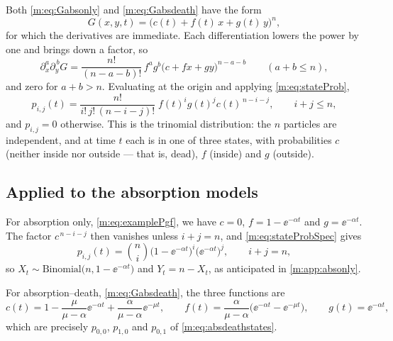 Both \cref{m:eq:Gabsonly} and \cref{m:eq:Gabsdeath} have the form
\begin{equation}
\label{m:eq:multilinear}
G(x,y,t) = \bigl(c(t) + f(t)\,x + g(t)\,y\bigr)^n ,
\end{equation}
for which the derivatives are immediate. Each differentiation lowers the power by
one and brings down a factor, so
\begin{equation}
\label{m:eq:derivs}
\partial_x^{a}\partial_y^{\,b}G
= \frac{n!}{(n-a-b)!}\,f^{a}g^{b}\bigl(c+fx+gy\bigr)^{n-a-b}
\qquad(a+b\le n),
\end{equation}
and zero for $a+b>n$. Evaluating at the origin and applying \cref{m:eq:stateProb},
\begin{equation}
\label{m:eq:stateProbSpec}
p_{i,j}(t) = \frac{n!}{i!\,j!\,(n-i-j)!}\;f(t)^{i}g(t)^{j}c(t)^{\,n-i-j},
\qquad i+j\le n,
\end{equation}
and $p_{i,j}=0$ otherwise. This is the trinomial distribution: the $n$ particles
are independent, and at time $t$ each is in one of three states, with probabilities
$c$ (neither inside nor outside --- that is, dead), $f$ (inside) and $g$ (outside).

\subsection*{Applied to the absorption models}

For absorption only, \cref{m:eq:examplePgf}, we have $c=0$, $f = 1-\ee^{-\alpha t}$
and $g = \ee^{-\alpha t}$. The factor $c^{\,n-i-j}$ then vanishes unless $i+j=n$,
and \cref{m:eq:stateProbSpec} gives
\begin{equation*}
p_{i,j}(t) = \binom{n}{i}\bigl(1-\ee^{-\alpha t}\bigr)^{i}\bigl(\ee^{-\alpha t}\bigr)^{j},
\qquad i+j=n,
\end{equation*}
so $X_t\sim\text{Binomial}\bigl(n,1-\ee^{-\alpha t}\bigr)$ and $Y_t = n-X_t$, as
anticipated in \cref{m:app:absonly}.

For absorption--death, \cref{m:eq:Gabsdeath}, the three functions are
\begin{equation*}
c(t) = 1-\frac{\mu}{\mu-\alpha}\ee^{-\alpha t} + \frac{\alpha}{\mu-\alpha}\ee^{-\mu t},
\qquad
f(t) = \frac{\alpha}{\mu-\alpha}\bigl(\ee^{-\alpha t}-\ee^{-\mu t}\bigr),
\qquad
g(t) = \ee^{-\alpha t},
\end{equation*}
which are precisely $p_{0,0}$, $p_{1,0}$ and $p_{0,1}$ of
\cref{m:eq:absdeathstates}.

\renewcommand{\thesection}{\thechapter.\arabic{section}}
